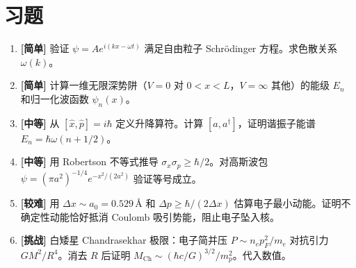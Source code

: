 \section*{习题}

\begin{enumerate}
  \item \textbf{[简单]} 验证 $\psi = A e^{i(kx-\omega t)}$ 满足自由粒子 Schr\"odinger 方程。求色散关系 $\omega(k)$。
  \item \textbf{[简单]} 计算一维无限深势阱（$V=0$ 对 $0<x<L$，$V=\infty$ 其他）的能级 $E_n$ 和归一化波函数 $\psi_n(x)$。
  \item \textbf{[中等]} 从 $[\hat{x},\hat{p}]=i\hbar$ 定义升降算符。计算 $[a,a^\dagger]$，证明谐振子能谱 $E_n=\hbar\omega(n+1/2)$。
  \item \textbf{[中等]} 用 Robertson 不等式推导 $\sigma_x\sigma_p \ge \hbar/2$。对高斯波包 $\psi=(\pi a^2)^{-1/4}e^{-x^2/(2a^2)}$ 验证等号成立。
  \item \textbf{[较难]} 用 $\Delta x\sim a_0=0.529$\,\AA{} 和 $\Delta p \ge \hbar/(2\Delta x)$ 估算电子最小动能。证明不确定性动能恰好抵消 Coulomb 吸引势能，阻止电子坠入核。
  \item \textbf{[挑战]} 白矮星 Chandrasekhar 极限：电子简并压 $P\sim n_e p_F^2/m_e$ 对抗引力 $GM^2/R^4$。消去 $R$ 后证明 $M_{\text{Ch}}\sim(\hbar c/G)^{3/2}/m_p^2$。代入数值。
\end{enumerate}
